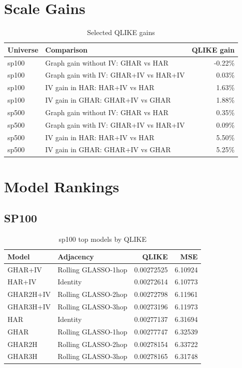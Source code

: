 \documentclass[11pt]{article}
\begin{document}
\section{Scale Gains}
\begin{table}[h]
\centering
\small
\caption{Selected QLIKE gains}
\begin{tabular}{llr}
\toprule
Universe & Comparison & QLIKE gain \\
\midrule
sp100 & Graph gain without IV: GHAR vs HAR & -0.22\% \\
sp100 & Graph gain with IV: GHAR+IV vs HAR+IV & 0.03\% \\
sp100 & IV gain in HAR: HAR+IV vs HAR & 1.63\% \\
sp100 & IV gain in GHAR: GHAR+IV vs GHAR & 1.88\% \\
sp500 & Graph gain without IV: GHAR vs HAR & 0.35\% \\
sp500 & Graph gain with IV: GHAR+IV vs HAR+IV & 0.09\% \\
sp500 & IV gain in HAR: HAR+IV vs HAR & 5.50\% \\
sp500 & IV gain in GHAR: GHAR+IV vs GHAR & 5.25\% \\
\bottomrule
\end{tabular}
\end{table}
\section{Model Rankings}
\subsection{SP100}
\begin{table}[h]
\centering
\small
\caption{sp100 top models by QLIKE}
\begin{tabular}{llrr}
\toprule
Model & Adjacency & QLIKE & MSE \\
\midrule
GHAR+IV & Rolling GLASSO-1hop & 0.00272525 & 6.10924 \\
HAR+IV & Identity & 0.00272614 & 6.10773 \\
GHAR2H+IV & Rolling GLASSO-2hop & 0.00272798 & 6.11961 \\
GHAR3H+IV & Rolling GLASSO-3hop & 0.00273196 & 6.11973 \\
HAR & Identity & 0.00277137 & 6.31694 \\
GHAR & Rolling GLASSO-1hop & 0.00277747 & 6.32539 \\
GHAR2H & Rolling GLASSO-2hop & 0.00278154 & 6.33722 \\
GHAR3H & Rolling GLASSO-3hop & 0.00278165 & 6.31748 \\
\bottomrule
\end{tabular}
\end{table}
\end{document}
